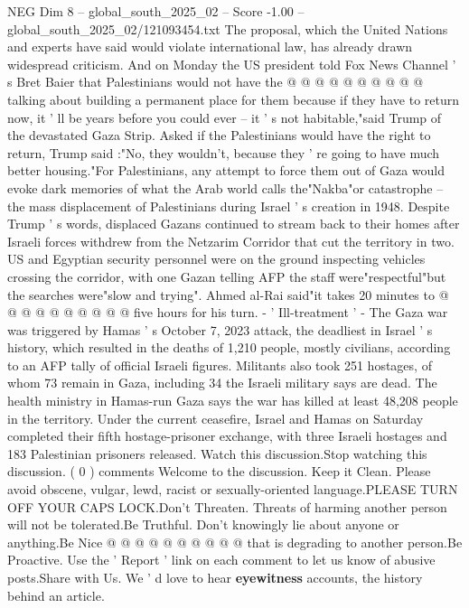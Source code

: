 \begin{textsample}{NEG Dim 8 – global\_south\_2025\_02 – Score -1.00 – global\_south\_2025\_02/121093454.txt}
The proposal, which the United Nations and experts have said would violate international law, has already drawn widespread criticism.
And on Monday the US president told Fox News Channel ' s Bret Baier that Palestinians would not have the @ @ @ @ @ @ @ @ @ @ talking about building a permanent place for them because if they have to return now, it ' ll be years before you could ever -- it ' s not habitable,"said Trump of the devastated Gaza Strip.
Asked if the Palestinians would have the right to return, Trump said :"No, they wouldn't, because they ' re going to have much better housing."For Palestinians, any attempt to force them out of Gaza would evoke dark memories of what the Arab world calls the"Nakba"or catastrophe -- the mass displacement of Palestinians during Israel ' s creation in 1948.
Despite Trump ' s words, displaced Gazans continued to stream back to their homes after Israeli forces withdrew from the Netzarim Corridor that cut the territory in two.
US and Egyptian security personnel were on the ground inspecting vehicles crossing the corridor, with one Gazan telling AFP the staff were"respectful"but the searches were"slow and trying".
Ahmed al-Rai said"it takes 20 minutes to @ @ @ @ @ @ @ @ @ @ five hours for his turn. - ' Ill-treatment ' - The Gaza war was triggered by Hamas ' s October 7, 2023 attack, the deadliest in Israel ' s history, which resulted in the deaths of 1,210 people, mostly civilians, according to an AFP tally of official Israeli figures.
Militants also took 251 hostages, of whom 73 remain in Gaza, including 34 the Israeli military says are dead.
The health ministry in Hamas-run Gaza says the war has killed at least 48,208 people in the territory.
Under the current ceasefire, Israel and Hamas on Saturday completed their fifth hostage-prisoner exchange, with three Israeli hostages and 183 Palestinian prisoners released.
Watch this discussion.Stop watching this discussion. ( 0 ) comments Welcome to the discussion.
Keep it Clean.
Please avoid obscene, vulgar, lewd, racist or sexually-oriented language.PLEASE TURN OFF YOUR CAPS LOCK.Don't Threaten.
Threats of harming another person will not be tolerated.Be Truthful.
Don't knowingly lie about anyone or anything.Be Nice @ @ @ @ @ @ @ @ @ @ that is degrading to another person.Be Proactive.
Use the ' Report ' link on each comment to let us know of abusive posts.Share with Us.
We ' d love to hear \textbf{eyewitness} accounts, the history behind an article.

\end{textsample}

